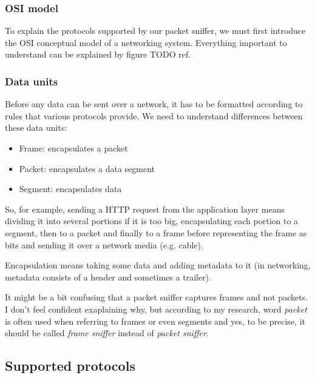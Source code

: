 \documentclass[a4paper]{article}
\begin{document}
  \subsubsection{OSI model}
  
  To explain the protocols supported by our packet sniffer, we must first 
  introduce the OSI conceptual model of a networking system. Everything 
  important to understand can be explained by figure TODO ref.


  \subsubsection{Data units}

  Before any data can be sent over a network, it has to be formatted according
  to rules that various protocols provide. We need to understand differences
  between these data units:
  \begin{itemize}
    \item Frame: encapsulates a packet
    \item Packet: encapsulates a data segment
    \item Segment: encapsulates data
  \end{itemize}
  So, for example, sending a HTTP request from the application layer means
  dividing it into several portions if it is too big, encapsulating each portion
  to a segment, then to a packet and finally to a frame before representing the 
  frame as bits and sending it over a network media (e.g. cable).

  \begin{notes}
    \item Encapsulation means taking some data and adding metadata to it (in
      networking, metadata consists of a header and sometimes a trailer).
    \item It might be a bit confusing that a packet sniffer captures frames and
      not packets. I don't feel confident exaplaining why, but according to my
      research, word \textit{packet} is often used when referring to frames or 
      even segments and yes, to be precise, it should be called 
      \textit{frame sniffer} instead of \textit{packet sniffer}.
  \end{notes}

  \newpage

  \subsection{Supported protocols}
\end{document}
